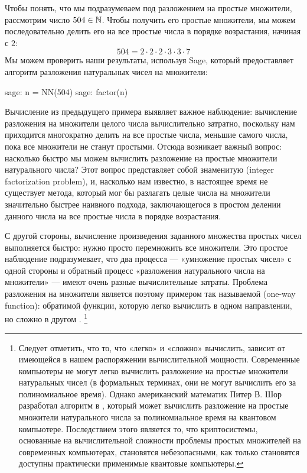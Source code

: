 \begin{example}\label{ex-prime-factorization} Чтобы понять, что мы подразумеваем под разложением на простые множители, рассмотрим число $504\in\mathbb{N}$. Чтобы получить его простые множители, мы можем последовательно делить его на все простые числа в порядке возрастания, начиная с $2$:
\begin{equation*}
504 = 2\cdot 2\cdot 2\cdot 3\cdot 3\cdot 7
\end{equation*}
Мы можем проверить наши результаты, используя Sage, который предоставляет алгоритм разложения натуральных чисел на множители:
\begin{sagecommandline}
sage: n = NN(504)
sage: factor(n)
\end{sagecommandline}
\end{example}

Вычисление из предыдущего примера выявляет важное наблюдение: вычисление разложения на множители целого числа вычислительно затратно, поскольку нам приходится многократно делить на все простые числа, меньшие самого числа, пока все множители не станут простыми. Отсюда возникает важный вопрос: насколько быстро мы можем вычислить разложение на простые множители натурального числа? Этот вопрос представляет собой знаменитую  (integer factorization problem), и, насколько нам известно, в настоящее время не существует метода, который мог бы разлагать целые числа на множители значительно быстрее наивного подхода, заключающегося в простом делении данного числа на все простые числа в порядке возрастания.

С другой стороны, вычисление произведения заданного множества простых чисел выполняется быстро: нужно просто перемножить все множители. Это простое наблюдение подразумевает, что два процесса — «умножение простых чисел» с одной стороны и обратный процесс «разложения натурального числа на множители» — имеют очень разные вычислительные затраты. Проблема разложения на множители является поэтому примером так называемой  (one-way function): обратимой функции, которую легко вычислить в одном направлении, но сложно в другом
. 
\footnote{Следует отметить, что то, что «легко» и «сложно» вычислить, зависит от имеющейся в нашем распоряжении вычислительной мощности. Современные компьютеры не могут легко вычислить разложение на простые множители натуральных чисел (в формальных терминах, они не могут вычислить его за полиномиальное время). Однако американский математик Питер В. Шор разработал алгоритм в \citeyear{shor94}, который может вычислить разложение на простые множители натурального числа за полиномиальное время на квантовом компьютере. Последствием этого является то, что криптосистемы, основанные на вычислительной сложности проблемы простых множителей на современных компьютерах, становятся небезопасными, как только становятся доступны практически применимые квантовые компьютеры.}


